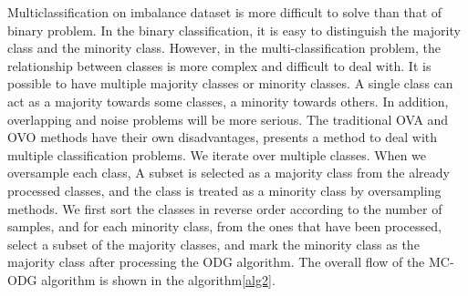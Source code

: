 \documentclass[runningheads]{llncs}
\begin{document}
Multiclassification on imbalance dataset is more difficult to solve than that of binary problem. 
In the binary classification, it is easy to distinguish the majority class and the minority class. 
However, in the multi-classification problem, the relationship between classes is more complex and difficult to deal with.
It is possible to have multiple majority classes or minority classes.
A single class can act as a majority towards some classes, a minority towards others.
In addition, overlapping and noise problems will be more serious.
The traditional OVA and OVO methods have their own disadvantages, 
\cite{2020Combined,2019Radial} presents a method to deal with multiple classification problems.
We iterate over multiple classes. When we oversample each class,
A subset is selected as a majority class from the already processed classes, 
and the class is treated as a minority class by oversampling methods.
We first sort the classes in reverse order according to the number of samples, and for each minority class, 
from the ones that have been processed,
select a subset of the majority classes, and mark the minority class as the majority
 class after processing the ODG algorithm.
 The overall flow of the MC-ODG algorithm is shown in the algorithm\ref{alg2}.
\end{document}
